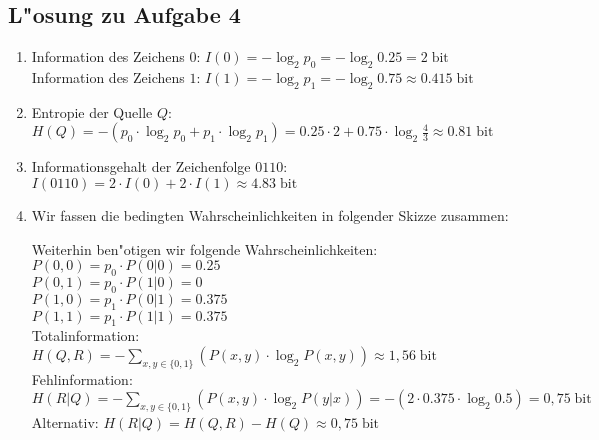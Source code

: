 \documentclass[10pt,oneside,onecolumn,a4paper,german,titlepage]{article}
\begin{document}
\subsection*{L"osung zu Aufgabe 4}
\begin{enumerate}
\item Information des Zeichens $0$: $I(0) = -\log_2{p_0} = -\log_2{0.25} =
2 \; \mbox{bit}$\\
Information des Zeichens $1$: $I(1) = -\log_2{p_1} = -\log_2{0.75} \approx
0.415 \; \mbox{bit}$
\item Entropie der Quelle $Q$: $H(Q) = -(p_0 \cdot \log_2{p_0} + p_1 \cdot
\log_2{p_1}) = 0.25 \cdot 2 + 0.75 \cdot \log_2{\frac{4}{3}} \approx
0.81 \; \mbox{bit}$
\item Informationsgehalt der Zeichenfolge $0110$: $I(0110) = 2 \cdot I(0) + 2 \cdot
I(1) \approx 4.83 \; \mbox{bit}$
\item Wir fassen die bedingten Wahrscheinlichkeiten in folgender Skizze zusammen:
\begin{center}
\end{center}
Weiterhin ben"otigen wir folgende Wahrscheinlichkeiten:\\
$P(0,0) = p_0 \cdot P(0|0) = 0.25$\\
$P(0,1) = p_0 \cdot P(1|0) = 0$\\
$P(1,0) = p_1 \cdot P(0|1) = 0.375$\\
$P(1,1) = p_1 \cdot P(1|1) = 0.375$\\[4pt]
Totalinformation: $H(Q,R) = -\sum\limits_{x,y \in \{0,1\}}(P(x,y) \cdot
\log_2{P(x,y)}) \approx 1,56 \; \mbox{bit}$\\
Fehlinformation: $H(R|Q) = -\sum\limits_{x,y \in \{0,1\}}(P(x,y) \cdot
\log_2{P(y|x)}) = -(2 \cdot 0.375 \cdot \log_2{0.5}) = 0,75 \; \mbox{bit}$\\
Alternativ: $H(R|Q) = H(Q,R) - H(Q) \approx 0,75 \; \mbox{bit}$

\end{enumerate}
\end{document}
